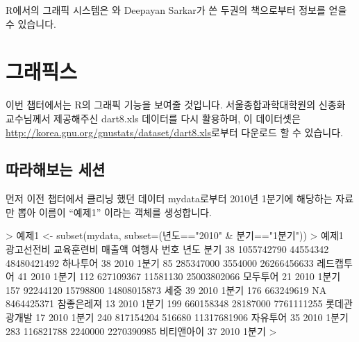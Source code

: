 %
%
%
%
%

R에서의 그래픽 시스템은 \citet{Murrell2005}와 Deepayan Sarkar가 쓴 두권의 책으로부터 정보를 얻을 수 있습니다.


\chapter{그래픽스}

이번 챕터에서는 R의 그래픽 기능을 보여줄 것입니다.
서울종합과학대학원의 신종화 교수님께서 제공해주신 dart8.xls 데이터를 다시 활용하며, 이 데이터셋은 \href{http://korea.gnu.org/gnustats/dataset/dart8.xls}{http://korea.gnu.org/gnustats/dataset/dart8.xls}로부터 다운로드 할 수 있습니다.

\section{따라해보는 세션}
먼저 이전 챕터에서 클리닝 했던 데이터 mydata로부터 2010년 1분기에 해당하는 자료만 뽑아 이름이 ``예제1'' 이라는 객체를 생성합니다.

\begin{Schunk}
\begin{Soutput}	
> 예제1 <- subset(mydata, subset=(년도=="2010" & 분기=="1분기"))
> 예제1 
    광고선전비 교육훈련비      매출액       여행사 번호 년도  분기
38  1055742790   44554342 48480421492     하나투어   38 2010 1분기
85   285347000    3554000 26266456633   레드캡투어   41 2010 1분기
112  627109367   11581130 25003802066     모두투어   21 2010 1분기
157   92244120   15798800 14808015873         세중   39 2010 1분기
176  663249619         NA  8464425371   참좋은레져   13 2010 1분기
199  660158348   28187000  7761111255 롯데관광개발   17 2010 1분기
240  817154204     516680 11317681906     자유투어   35 2010 1분기
283  116821788    2240000  2270390985   비티앤아이   37 2010 1분기
>
\end{Soutput}
\end{Schunk}

